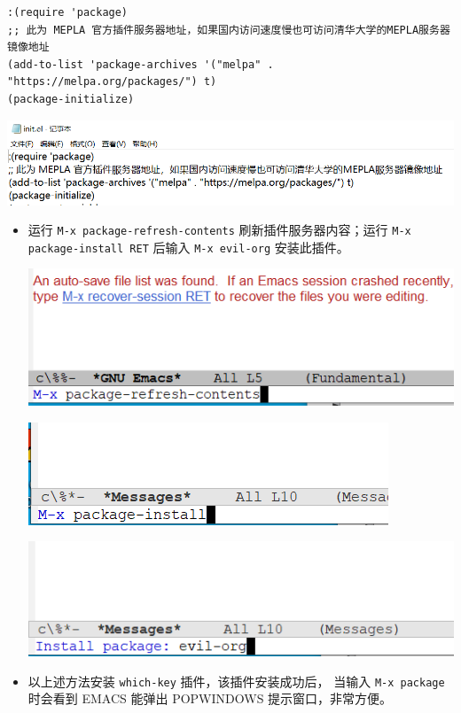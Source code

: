 \documentclass[UTF8]{ctexart}
\begin{document}
\begin{itemize}
\begin{itemize}
\begin{verbatim}
:(require 'package)
;; 此为 MEPLA 官方插件服务器地址，如果国内访问速度慢也可访问清华大学的MEPLA服务器镜像地址
(add-to-list 'package-archives '("melpa" . "https://melpa.org/packages/") t)
(package-initialize)
\end{verbatim}
\end{itemize}
\begin{center}
\includegraphics[width=.9\linewidth]{image/9.png}
\end{center}
\begin{itemize}
\item 运行 \texttt{M-x package-refresh-contents} 刷新插件服务器内容；运行 \texttt{M-x package-install RET} 后输入 \texttt{M-x evil-org} 安装此插件。
\begin{center}
\includegraphics[width=.9\linewidth]{image/10.png}
\end{center}
\begin{center}
\includegraphics[width=.9\linewidth]{image/11.png}
\end{center}
\begin{center}
\includegraphics[width=.9\linewidth]{image/12.png}
\end{center}
\item 以上述方法安装 \texttt{which-key} 插件，该插件安装成功后， 当输入 \texttt{M-x package} 时会看到 EMACS 能弹出 POPWINDOWS 提示窗口，非常方便。
\end{itemize}


\end{itemize}
\end{document}
